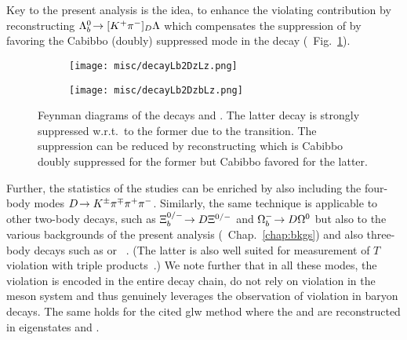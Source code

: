 Key to the present analysis is the idea, to enhance the \CP violating contribution by reconstructing ${{\Lambda}^0_{b}}\!\rightarrow [{{K}^+}{{\pi}^-}]_{D}{\Lambda}$ which compensates the suppression of \decay{\Lb}{\Dzb\Lz} by favoring the Cabibbo (doubly) suppressed \decay{\Dz}{\Kp\pim} mode in the \decay{\Lb}{\Dz\Lz} decay (\cf{}~Fig.~\ref{fig:decaysLbToDzLz}).
\begin{figure}
    \centering
    \begin{subfigure}{.49\textwidth}
        \centering
        \texttt{[image: misc/decayLb2DzLz.png]}
        \caption{\decay{\Lb}{\Dz\Lz}}
    \end{subfigure}
    \begin{subfigure}{.49\textwidth}
        \centering
        \texttt{[image: misc/decayLb2DzbLz.png]}
        \caption{\decay{\Lb}{\Dzb\Lz}}
    \end{subfigure}
    \caption{Feynman diagrams of the decays \decay{\Lb}{\Dz\Lz} and \decay{\Lb}{\Dzb\Lz}. The latter decay is strongly suppressed w.r.t.\ to the former due to the \decay{\bquark}{\uquark} transition. The suppression can be reduced by reconstructing \decay{\PD}{\Kp\pim} which is Cabibbo doubly suppressed for the former but Cabibbo favored for the latter.}
    \label{fig:decaysLbToDzLz}
\end{figure}
Further, the statistics of the studies can be enriched by also including the four-body modes $D\!\rightarrow {\ensuremath{{K}^\pm}}{\ensuremath{{\pi}^\mp}}{\ensuremath{{\pi}^+}}{\ensuremath{{\pi}^-}}$.
Similarly, the same technique is applicable to other two-body decays, such as ${\Xi}_{b}^{0/-}\!\rightarrow D{\Xi}^{0/-}$ and ${{\Omega}^-_{b}}\!\rightarrow D{\Omega}^0$ but also to the various backgrounds of the present analysis (\cf{}~Chap.~\ref{chap:bkgs}) and also three-body decays such as \decay{\Lb}{\Dz\proton\Km} or \decay{\Lb}{\Lz\pip\pim}~\cite{cpvinLbToLzpipi}. (The latter is also well suited for measurement of $T$ violation with triple products~\cite{tvinLbToLzpipi}.)
We note further that in all these modes, the \CP violation is encoded in the entire decay chain, do not rely on \CP violation in the \PD meson system and thus genuinely leverages the observation of \CP violation in baryon decays. 
The same holds for the cited \gls{glw} method where the \Dz and \Dzb are reconstructed in \CP eigenstates \Kp\Km and \pip\pim.

